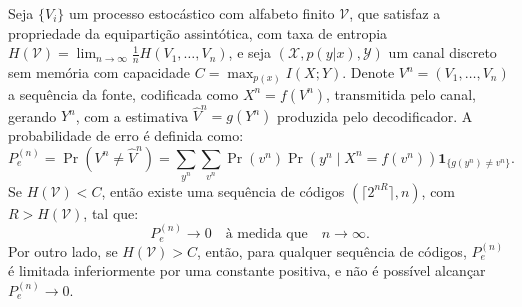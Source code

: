 

%
%
%
%


\begin{theorem}
Seja $\{V_i\}$ um processo estocástico com alfabeto finito $\mathcal{V}$, que
satisfaz a propriedade da equipartição assintótica, com taxa de entropia
$H(\mathcal{V}) = \lim_{n \to \infty} \frac{1}{n} H(V_1, \ldots, V_n)$, e seja
$(\mathcal{X}, p(y|x), \mathcal{Y})$ um canal discreto sem memória com capacidade 
$C = \max_{p(x)} I(X; Y)$. Denote $V^n = (V_1, \ldots, V_n)$ a sequência da fonte, codificada
como $X^n = f(V^n)$, transmitida pelo canal, gerando $Y^n$, com a estimativa
$\hat{V}^n = g(Y^n)$ produzida pelo decodificador. A probabilidade de erro é
definida como:
\begin{equation}
P_e^{(n)} = \Pr(V^n \neq \hat{V}^n) = \sum_{y^n} \sum_{v^n} \Pr(v^n) \Pr(y^n \mid X^n = f(v^n)) \mathbf{1}_{\{ g(y^n) \neq v^n \}}.
\end{equation}
Se $H(\mathcal{V}) < C$, então existe uma sequência de códigos $(\lceil 2^{nR} \rceil, n)$, com $R > H(\mathcal{V})$, tal que:
\begin{equation}
P_e^{(n)} \to 0 \quad \text{à medida que} \quad n \to \infty.
\end{equation}
Por outro lado, se $H(\mathcal{V}) > C$, então, para qualquer sequência de
códigos, $P_e^{(n)}$ é limitada inferiormente por uma constante positiva, e não
é possível alcançar $P_e^{(n)} \to 0$.
\end{theorem}


